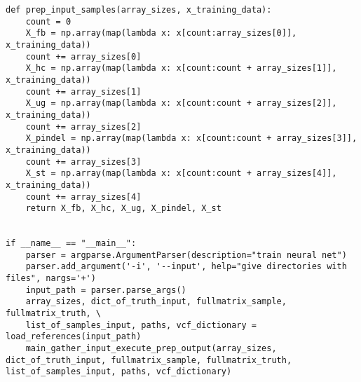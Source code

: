 \documentclass{article}
\begin{document}
\begin{verbatim}
def prep_input_samples(array_sizes, x_training_data):
    count = 0
    X_fb = np.array(map(lambda x: x[count:array_sizes[0]], x_training_data))
    count += array_sizes[0]
    X_hc = np.array(map(lambda x: x[count:count + array_sizes[1]], x_training_data))
    count += array_sizes[1]
    X_ug = np.array(map(lambda x: x[count:count + array_sizes[2]], x_training_data))
    count += array_sizes[2]
    X_pindel = np.array(map(lambda x: x[count:count + array_sizes[3]], x_training_data))
    count += array_sizes[3]
    X_st = np.array(map(lambda x: x[count:count + array_sizes[4]], x_training_data))
    count += array_sizes[4]
    return X_fb, X_hc, X_ug, X_pindel, X_st


if __name__ == "__main__":
    parser = argparse.ArgumentParser(description="train neural net")
    parser.add_argument('-i', '--input', help="give directories with files", nargs='+')
    input_path = parser.parse_args()
    array_sizes, dict_of_truth_input, fullmatrix_sample, fullmatrix_truth, \
    list_of_samples_input, paths, vcf_dictionary = load_references(input_path)
    main_gather_input_execute_prep_output(array_sizes, dict_of_truth_input, fullmatrix_sample, fullmatrix_truth, list_of_samples_input, paths, vcf_dictionary)
\end{verbatim}
\end{document}
